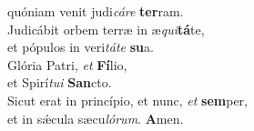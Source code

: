 \evenverse quóniam venit judi\textit{cá}\textit{re} \textbf{ter}ram.\\
\oddverse Judicábit orbem terræ in æ\textit{qui}\textbf{tá}te,~\*\\
\oddverse et pópulos in veri\textit{tá}\textit{te} \textbf{su}a.\\
\evenverse Glória Patri, \textit{et} \textbf{Fí}lio,~\*\\
\evenverse et Spirí\textit{tu}\textit{i} \textbf{San}cto.\\
\oddverse Sicut erat in princípio, et nunc, \textit{et} \textbf{sem}per,~\*\\
\oddverse et in sǽcula sæcu\textit{ló}\textit{rum}. \textbf{A}men.\\
